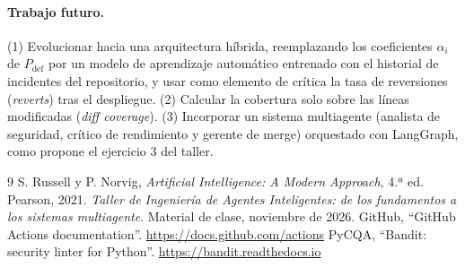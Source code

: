 \documentclass[11pt,a4paper]{article}
\newcommand{\Pdef}{P_{\text{def}}}
\begin{document}
\paragraph{Trabajo futuro.}
(1) Evolucionar hacia una arquitectura híbrida, reemplazando los coeficientes $\alpha_i$ de
$\Pdef$ por un modelo de aprendizaje automático entrenado con el historial de incidentes del
repositorio, y usar como elemento de crítica la tasa de reversiones (\textit{reverts}) tras el
despliegue.
(2) Calcular la cobertura solo sobre las líneas modificadas (\textit{diff coverage}).
(3) Incorporar un sistema multiagente (analista de seguridad, crítico de rendimiento y gerente de
merge) orquestado con LangGraph, como propone el ejercicio 3 del taller.

\begin{thebibliography}{9}
 S. Russell y P. Norvig, \textit{Artificial Intelligence: A Modern Approach}, 4.ª ed. Pearson, 2021.
 \textit{Taller de Ingeniería de Agentes Inteligentes: de los fundamentos a los sistemas multiagente}. Material de clase, noviembre de 2026.
 GitHub, ``GitHub Actions documentation''. \url{https://docs.github.com/actions}
 PyCQA, ``Bandit: security linter for Python''. \url{https://bandit.readthedocs.io}
\end{thebibliography}
\end{document}
